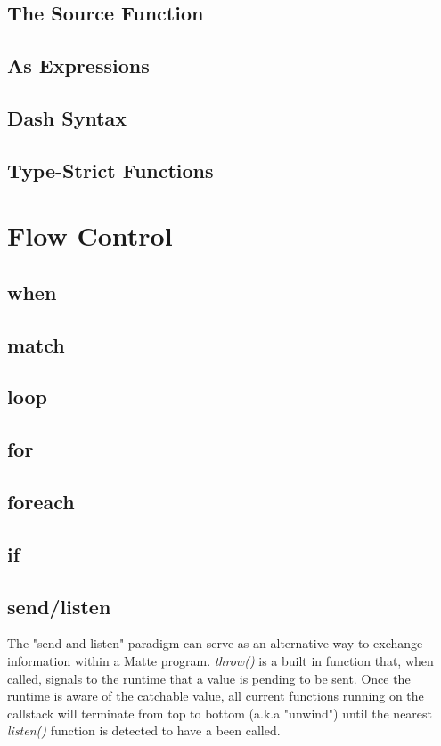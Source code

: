 \documentclass[12pt,letterpaper]{report}
\begin{document}
\section{The Source Function}\label{The Source Function}
\section{As Expressions}\label{As Expressions}
\section{Dash Syntax}\label{Dash Syntax}
\section{Type-Strict Functions}\label{Type-Strict Functions}
\chapter{Flow Control}\label{Flow Control}
\section{when}\label{when}
\section{match}\label{match}
\section{loop}\label{loop}
\section{for}\label{for}
\section{foreach}\label{foreach}
\section{if}\label{if}
\section{send/listen}\label{send/listen}

The "send and listen" paradigm can serve as an alternative way to exchange information within 
a Matte program. \textit{throw()} is a built in function that, when called, signals to the runtime
that a value is pending to be sent. Once the runtime is aware of the catchable value, all current 
functions running on the callstack will terminate from top to bottom (a.k.a "unwind") until the nearest
\textit{listen()} function is detected to have a been called.
\end{document}
